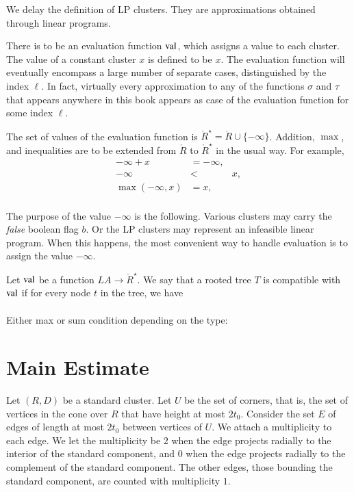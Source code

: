 We delay the definition of LP clusters.  They are approximations
obtained through linear programs.



There is to be an evaluation function ${\operatorname{val}}$, which assigns a value
to each cluster.  The value of a constant cluster $x$ is defined to be $x$.
The evaluation function will eventually encompass a large number of
separate cases, distinguished by the index $\ell$.  
In fact, virtually every approximation
to any of the functions $\sigma$ and $\tau$ that appears anywhere
in this book appears as case of the evaluation function for some index
$\ell$.

The set of values of the evaluation function is 
$\ring{R}^\star = \ring{R}\cup\{-\infty\}$.
Addition, $\max$, and inequalities are to be extended from
$\ring{R}$ to $\ring{R}^\star$ in the usual way.  For example,
  $$
  \begin{array}{lll}
    -\infty + x &= -\infty,\\
    -\infty &< & x,\\
    \max(-\infty,x) &= x,\\
    \end{array}
  $$

The purpose of the value $-\infty$ is the following.  Various
clusters may carry the {\it false} boolean flag $b$.  Or the
LP clusters may represent an infeasible linear program.  When
this happens, the most convenient way to handle evaluation is
to assign the value $-\infty$.

\begin{definition}
Let ${\operatorname{val}}$
be a function $LA\to \ring{R}^\star$.  We say that
a rooted tree $T$ is compatible with ${\operatorname{val}}$ if for every
node $t$ in the tree, we have
   $$
   \begin{array}{lll}
     \end{array}
   $$
\end{definition}

Either max or sum condition depending on the type:





\section{Main Estimate} %
    \label{sec:the-main-theorem}

Let $(R,D)$ be a standard cluster. Let $U$ be the set of corners,
that is, the set of vertices in the cone over $R$ that have height
at most $2t_0$.  Consider the set $E$ of edges of length at most
$2t_0$ between vertices of $U$. We attach a multiplicity to each
edge. We let the multiplicity be $2$ when the edge projects
radially to the interior of the standard component, and $0$ when the
edge projects radially to the complement of the standard component.
The other edges, those bounding the standard component, are counted
with multiplicity $1$.

